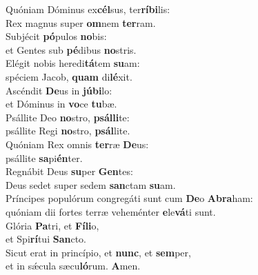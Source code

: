 \evenverse Quóniam Dóminus ex\textbf{cél}sus, ter\textbf{rí}\textbf{bi}lis:~\*\\
\evenverse Rex magnus super \textbf{om}nem \textbf{ter}ram.\\
\oddverse Subjécit \textbf{pó}pulos \textbf{no}bis:~\*\\
\oddverse et Gentes sub \textbf{pé}dibus \textbf{no}stris.\\
\evenverse Elégit nobis heredi\textbf{tá}tem \textbf{su}am:~\*\\
\evenverse spéciem Jacob, \textbf{quam} di\textbf{lé}xit.\\
\oddverse Ascéndit \textbf{De}us in \textbf{jú}\textbf{bi}lo:~\*\\
\oddverse et Dóminus in \textbf{vo}ce \textbf{tu}bæ.\\
\evenverse Psállite Deo \textbf{no}stro, \textbf{psál}\textbf{li}te:~\*\\
\evenverse psállite Regi \textbf{no}stro, \textbf{psál}lite.\\
\oddverse Quóniam Rex omnis \textbf{ter}ræ \textbf{De}us:~\*\\
\oddverse psállite \textbf{sa}pi\textbf{én}ter.\\
\evenverse Regnábit Deus \textbf{su}per \textbf{Gen}tes:~\*\\
\evenverse Deus sedet super sedem \textbf{san}ctam \textbf{su}am.\\
\oddverse Príncipes populórum congregáti sunt cum \textbf{De}o \textbf{A}\textbf{bra}ham:~\*\\
\oddverse quóniam dii fortes terræ veheménter \textbf{e}le\textbf{vá}ti sunt.\\
\evenverse Glória \textbf{Pa}tri, et \textbf{Fí}\textbf{li}o,~\*\\
\evenverse et Spi\textbf{rí}tui \textbf{San}cto.\\
\oddverse Sicut erat in princípio, et \textbf{nunc}, et \textbf{sem}per,~\*\\
\oddverse et in sǽcula sæcu\textbf{ló}rum. \textbf{A}men.\\
